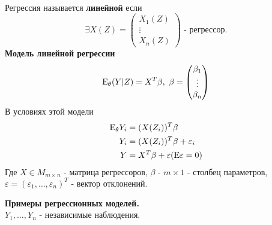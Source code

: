 \documentclass[main.tex]{subfiles}
\begin{document}
\begin{definition} ~\\
	Регрессия называется \textbf{линейной} если
	\[\exists X(Z)=
		\begin{pmatrix}
		X_1(Z)\\
		\vdots\\
		X_n(Z)
		\end{pmatrix}
		\text{ - регрессор.} 
	\]
	\textbf{Модель линейной регрессии}
	\[\mathrm{E}_\theta(Y|Z) = X^T\beta,\ \beta =
		\begin{pmatrix}
			\beta_1\\
			\vdots\\
			\beta_n
		\end{pmatrix}
	\]
	В условиях этой модели
	\begin{align*}
		\mathrm{E}_\theta Y_i &= (X(Z_i))^T\beta\\
		Y_i &= (X(Z_i))^T\beta + \varepsilon_i\\
		Y &= X^T\beta + \varepsilon (\mathrm{E}\varepsilon = 0)\\
	\end{align*}
	Где $X \in M_{m\times n}$ - матрица регрессоров, $\beta$ - $m \times 1$ - столбец параметров, $\varepsilon = (\varepsilon_1,\dots,\varepsilon_n)^T\text{ - вектор отклонений.}$
\end{definition}
\textbf{Примеры регрессионных моделей.} ~\\
$Y_1,\dots,Y_n$ - независимые наблюдения.
\end{document}
